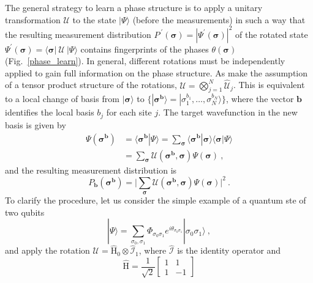 \documentclass[submission, Phys]{SciPost}
\begin{document}
The general strategy to learn a phase structure is to apply a unitary transformation $\bm{\mathcal{U}}$ to the state $|\Psi\rangle$ (before the measurements) in such a way that the resulting measurement distribution $P^{\:\prime}(\bm{\sigma})=|\Psi^\prime(\bm{\sigma})|^2$ of the rotated state $\Psi^\prime(\bm{\sigma})=\langle\bm{\sigma}|\:\bm{\mathcal{U}}\:|\Psi\rangle$ contains fingerprints of the phases $\theta(\bm{\sigma})$ (Fig.~\ref{phase_learn}). In general, different rotations must be independently applied to gain full information on the phase structure. As make the assumption of a tensor product structure of the rotations, $\bm{\mathcal{U}}=\bigotimes_{j=1}^N\hat{\mathcal{U}}_j$. This is equivalent to a local change of basis from $|\bm{\sigma}\rangle$ to $\{|\bm{\sigma}^{\bm{b}}\rangle=|\sigma_1^{b_1},\dots,\sigma_N^{b_N}\rangle\}$, where the vector $\bm{b}$ identifies the local basis $b_j$ for each site $j$. The target wavefunction in the new basis is given by
\begin{equation}
\begin{split}
\Psi(\bm{\sigma}^{\bm{b}})
&=\langle \bm{\sigma}^{\bm{b}}|\Psi\rangle=\sum_{\bm{\sigma}}\langle \bm{\sigma}^{\bm{b}}|\bm{\sigma}\rangle\langle\bm{\sigma}|\Psi\rangle\\
&=\sum_{\bm{\sigma}}\mathcal{U}(\bm{\sigma}^{\bm{b}},\bm{\sigma})\Psi(\bm{\sigma})\:,
\end{split}
\end{equation}
and the resulting measurement distribution is
\begin{equation}
P_{\bm{b}}(\bm{\sigma}^{\bm{b}})=\bigg|\sum_{\bm{\sigma}}\mathcal{U}(\bm{\sigma}^{\bm{b}},\bm{\sigma})\Psi(\bm{\sigma})\bigg|^2\:.
\end{equation}
To clarify the procedure, let us consider the simple example of a quantum ste of two qubits
\begin{equation}
|\Psi\rangle=\sum_{\sigma_0,\sigma_1}\Phi_{\sigma_0\sigma_1}e^{i\theta_{\sigma_0\sigma_1}}|\sigma_0\sigma_1\rangle\:,
\end{equation}
and apply the rotation $\bm{\mathcal{U}}=\hat{\mathrm{H}}_0\otimes\hat{\mathcal{I}}_1$, where $\hat{\mathcal{I}}$ is the identity operator and 
\begin{equation}
\hat{\mathrm{H}}=\frac{1}{\sqrt{2}}\begin{bmatrix}1 & 1\\
1 & -1
\end{bmatrix}
\end{equation}
\end{document}
